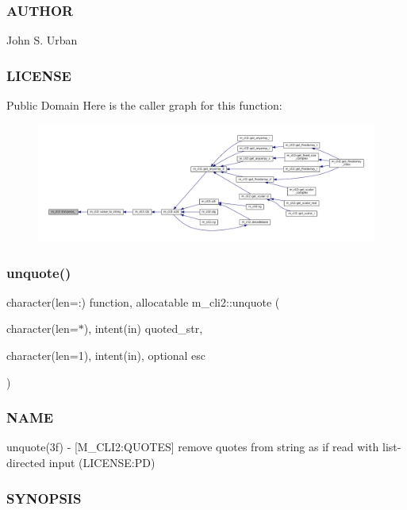\subsubsection*{A\+U\+T\+H\+OR}

John S. Urban \subsubsection*{L\+I\+C\+E\+N\+SE}

Public Domain Here is the caller graph for this function\+:
\nopagebreak
\begin{figure}[H]
\begin{center}
\leavevmode
\includegraphics[width=350pt]{namespacem__cli2_a770a66475094fd80493d46498de1ebf7_icgraph}
\end{center}
\end{figure}
\mbox{\label{namespacem__cli2_a9cab7352414f8b5625330a9ff5cf0cb4}} 
\subsubsection{\texorpdfstring{unquote()}{unquote()}}
{\footnotesize\ttfamily character(len=\+:) function, allocatable m\+\_\+cli2\+::unquote (\begin{DoxyParamCaption}\item[{character(len=$\ast$), intent(in)}]{quoted\+\_\+str,  }\item[{character(len=1), intent(in), optional}]{esc }\end{DoxyParamCaption})\hspace{0.3cm}{\ttfamily [private]}}



\subsubsection*{N\+A\+ME}

unquote(3f) -\/ \mbox{[}M\+\_\+\+C\+L\+I2\+:Q\+U\+O\+T\+ES\mbox{]} remove quotes from string as if read with list-\/directed input (L\+I\+C\+E\+N\+SE\+:PD) \subsubsection*{S\+Y\+N\+O\+P\+S\+IS}

